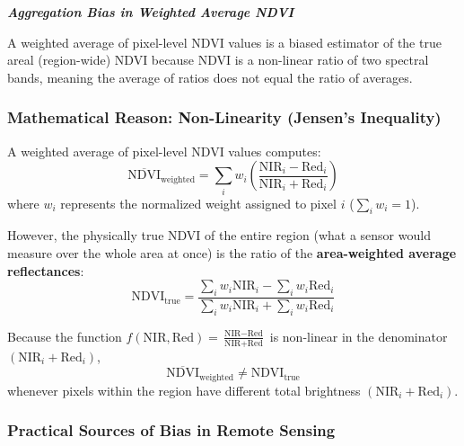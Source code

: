 \documentclass[12pt, letterpaper]{article}
\begin{document}
\bigskip
\LARGE
\begin{flushleft}
\textbf{\textit{Aggregation Bias in Weighted Average NDVI}}
\end{flushleft}
\normalsize
A weighted average of pixel-level NDVI values is a biased estimator of the true areal (region-wide) NDVI because NDVI is a non-linear ratio of two spectral bands, meaning the average of ratios does not equal the ratio of averages.

\subsubsection*{Mathematical Reason: Non-Linearity (Jensen's Inequality)}

A weighted average of pixel-level NDVI values computes:
\begin{equation}
\overline{\text{NDVI}}_{\text{weighted}} = \sum_{i} w_i \left(\frac{\text{NIR}_i - \text{Red}_i}{\text{NIR}_i + \text{Red}_i}\right)
\end{equation}
where $w_i$ represents the normalized weight assigned to pixel $i$ ($\sum_i w_i = 1$).


However, the physically true NDVI of the entire region (what a sensor would measure over the whole area at once) is the ratio of the \textbf{area-weighted average reflectances}:
\begin{equation}
\text{NDVI}_{\text{true}} = \frac{\sum_{i} w_i \text{NIR}_i - \sum_{i} w_i \text{Red}_i}{\sum_{i} w_i \text{NIR}_i + \sum_{i} w_i \text{Red}_i}
\end{equation}

Because the function $f(\text{NIR}, \text{Red}) = \frac{\text{NIR} - \text{Red}}{\text{NIR} + \text{Red}}$ is non-linear in the denominator $(\text{NIR}_i + \text{Red}_i)$,
\begin{equation}
\overline{\text{NDVI}}_{\text{weighted}} \neq \text{NDVI}_{\text{true}}
\end{equation}
whenever pixels within the region have different total brightness $(\text{NIR}_i + \text{Red}_i)$.

\subsubsection*{Practical Sources of Bias in Remote Sensing}
\end{document}
